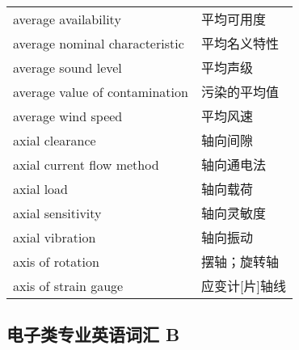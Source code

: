 \documentclass[
]{article}
\begin{document}
\begin{longtable}[]{@{}ll@{}}
average availability & 平均可用度 \\
average nominal characteristic & 平均名义特性 \\
average sound level & 平均声级 \\
average value of contamination & 污染的平均值 \\
average wind speed & 平均风速 \\
axial clearance & 轴向间隙 \\
axial current flow method & 轴向通电法 \\
axial load & 轴向载荷 \\
axial sensitivity & 轴向灵敏度 \\
axial vibration & 轴向振动 \\
axis of rotation & 摆轴；旋转轴 \\
axis of strain gauge & 应变计{[}片{]}轴线 \\
\bottomrule()
\end{longtable}

\hypertarget{ux7535ux5b50ux7c7bux4e13ux4e1aux82f1ux8bedux8bcdux6c47-b}{%
\subsection{\texorpdfstring{电子类专业英语词汇 B
}{电子类专业英语词汇 B }}\label{ux7535ux5b50ux7c7bux4e13ux4e1aux82f1ux8bedux8bcdux6c47-b}}
\end{document}
